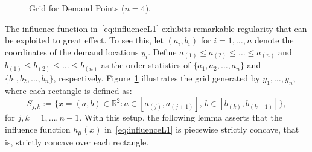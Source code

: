 \documentclass[stsy,sglanonrev]{informs4}
\begin{document}
\begin{figure}[htbp]
    \centering
    \caption{Grid for Demand Points (\(n=4\)).}
    \label{fig:GridL1}
\end{figure}

The influence function in~\eqref{eq:influenceL1} exhibits remarkable regularity that can be exploited to great effect. To see this, let \((a_i, b_i)\) for \(i = 1, \dots, n\) denote the coordinates of the demand locations \(y_i\). Define \(a_{(1)} \leq a_{(2)} \leq \dots \leq a_{(n)}\) and \(b_{(1)} \leq b_{(2)} \leq \dots \leq b_{(n)}\) as the order statistics of \(\{a_1, a_2, \dots, a_n\}\) and \(\{b_1, b_2, \dots, b_n\}\), respectively. Figure~\ref{fig:GridL1} illustrates the grid generated by \(y_1, \dots, y_n\), where each rectangle is defined as:
\begin{equation}\label{eq:rectangle}
    S_{j,k} := \{x = (a, b) \in \mathbb{R}^2 : a \in [a_{(j)}, a_{(j+1)}], \, b \in [b_{(k)}, b_{(k+1)}]\},
\end{equation}
for \(j, k = 1, \dots, n-1\). With this setup, the following lemma asserts that the influence function \(h_{\mu}(x)\) in~\eqref{eq:influenceL1} is piecewise strictly concave, that is, strictly concave over each rectangle.
\end{document}
